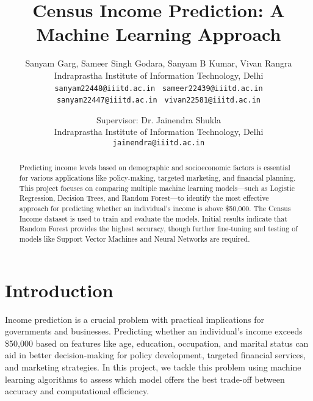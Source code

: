 \documentclass[10pt,twocolumn,letterpaper]{article}
\begin{document}
 

\title{Census Income Prediction: A Machine Learning Approach}

\author{Sanyam Garg, Sameer Singh Godara, Sanyam B Kumar, Vivan Rangra\\
Indraprastha Institute of Information Technology, Delhi \\
{\tt\small sanyam22448@iiitd.ac.in } {\tt\small sameer22439@iiitd.ac.in} \\{\tt\small sanyam22447@iiitd.ac.in } {\tt\small vivan22581@iiitd.ac.in} \\
\and
Supervisor: Dr. Jainendra Shukla\\
Indraprastha Institute of Information Technology, Delhi \\
{\tt\small jainendra@iiitd.ac.in}
}

\maketitle

\begin{abstract}
   Predicting income levels based on demographic and socioeconomic factors is essential for various applications like policy-making, targeted marketing, and financial planning. This project focuses on comparing multiple machine learning models—such as Logistic Regression, Decision Trees, and Random Forest—to identify the most effective approach for predicting whether an individual's income is above \$50,000. The Census Income dataset is used to train and evaluate the models. Initial results indicate that Random Forest provides the highest accuracy, though further fine-tuning and testing of models like Support Vector Machines and Neural Networks are required.
\end{abstract}

\section{Introduction}
\label{sec:intro}

Income prediction is a crucial problem with practical implications for governments and businesses. Predicting whether an individual’s income exceeds \$50,000 based on features like age, education, occupation, and marital status can aid in better decision-making for policy development, targeted financial services, and marketing strategies. In this project, we tackle this problem using machine learning algorithms to assess which model offers the best trade-off between accuracy and computational efficiency. 
\end{document}
